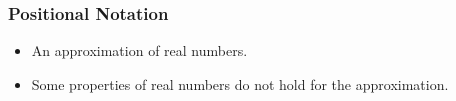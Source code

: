 \begin{frame}

\frametitle{Positional Notation}

\begin{itemize}

\item An approximation of real numbers.

\item Some properties of real numbers do not hold for the approximation.

\end{itemize}

\end{frame}
